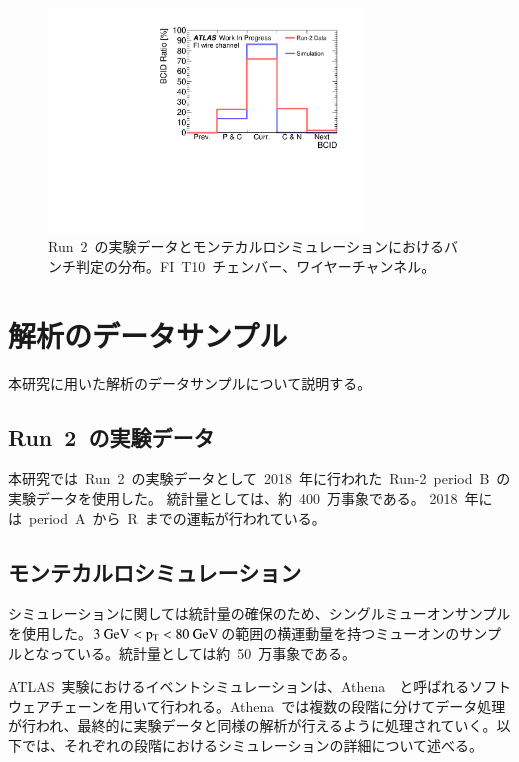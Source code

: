 \begin{figure}[H]
        \centering   
        \includegraphics[width=0.75\textwidth,page=1]{img/pdf5/BCID0.pdf}
        \caption[Run~2~の実験データとモンテカルロシミュレーションにおけるバンチ判定の分布]{Run~2~の実験データとモンテカルロシミュレーションにおけるバンチ判定の分布。FI~T10~チェンバー、ワイヤーチャンネル。}
        \label{fig:bcid00}
\end{figure}

\section{解析のデータサンプル}
本研究に用いた解析のデータサンプルについて説明する。

\subsection{Run~2~の実験データ}
本研究では~Run~2~の実験データとして~2018~年に行われた~Run-2~period~B~の実験データを使用した。
統計量としては、約~400~万事象である。
2018~年には~period~A~から~R~までの運転が行われている。

\subsection{モンテカルロシミュレーション}
シミュレーションに関しては統計量の確保のため、シングルミューオンサンプルを使用した。$3~\rm{GeV}<p_{\rm{T}}<80~GeV$の範囲の横運動量を持つミューオンのサンプルとなっている。統計量としては約~50~万事象である。

ATLAS~実験におけるイベントシミュレーションは、Athena~\cite{URL:21}~と呼ばれるソフトウェアチェーンを用いて行われる。Athena~では複数の段階に分けてデータ処理が行われ、最終的に実験データと同様の解析が行えるように処理されていく。以下では、それぞれの段階におけるシミュレーションの詳細について述べる。

